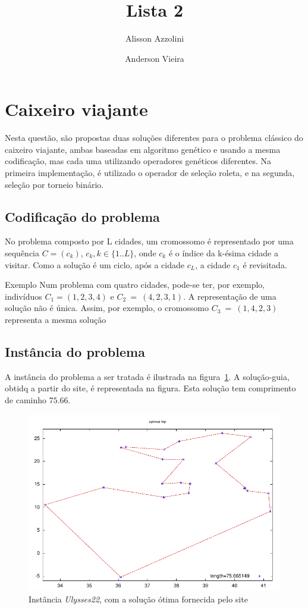 \documentclass[a4paper]{article}
\title{Lista 2}
\author{Alisson Azzolini \and Anderson Vieira}
\begin{document}
\maketitle

\section{Caixeiro viajante}
Nesta questão, são propostas duas soluções diferentes para o problema clássico do caixeiro viajante, ambas baseadas em algoritmo genético e usando a mesma codificação, mas cada uma utilizando operadores genéticos diferentes. Na primeira implementação, é utilizado o operador de seleção roleta, e na segunda, seleção por torneio binário.

\subsection{Codificação do problema}
No problema composto por L cidades, um cromossomo é representado por uma sequência $ C = ( c_k ) $, $ c_k, k \in \{1..L\} $, onde $ c_k $ é o índice da k-ésima cidade a visitar. Como a solução é um ciclo, após a cidade $ c_L $, a cidade $ c_1 $ é revisitada.

\textsf{Exemplo} Num problema com quatro cidades, pode-se ter, por exemplo, indivíduos $ C_1 = (1, 2, 3, 4) $ e $ C_2~=~(4, 2, 3, 1) $. A representação de uma solução não é única. Assim, por exemplo, o cromossomo $ C_3~=~(1, 4, 2, 3) $ representa a mesma solução 

\subsection{Instância do problema}

A instância do problema a ser tratada é ilustrada na figura~\ref{fig:otima}. A solução-guia, obtidq a partir do site, é representada na figura. Esta solução tem comprimento de caminho $75.66$.

\begin{figure}[h!]
  \centering
  \includegraphics[scale=0.8]{optimal_trip}
  \caption{Instância \textit{Ulysses22}, com a solução ótima fornecida pelo site}
  \label{fig:otima}
\end{figure}
\end{document}
